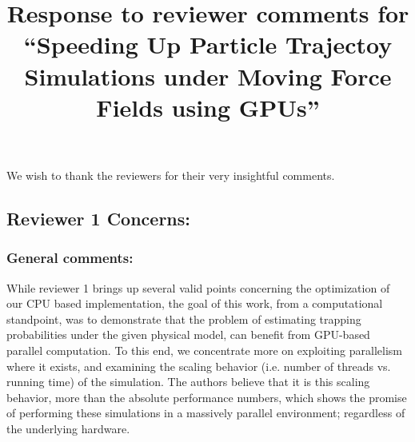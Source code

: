 \documentclass[10pt]{article}
\title{Response to reviewer comments for ``Speeding Up Particle
  Trajectoy Simulations under Moving Force Fields using GPUs''}
\begin{document}
\maketitle

\section*{}
We wish to thank the reviewers for their very insightful comments.

\subsection*{Reviewer 1 Concerns:}
\subsubsection*{General comments:}

While reviewer 1 brings up several valid points concerning the optimization of our CPU
based implementation, the goal of this work, from a computational
standpoint, was to demonstrate that the problem of estimating trapping
probabilities under the given physical model, can benefit from GPU-based parallel computation.
To this end, we concentrate more on exploiting
parallelism where it exists, and examining the scaling behavior
(i.e. number of threads vs. running time) of the simulation.  The
authors believe that it is this scaling behavior, more than the
absolute performance numbers, which shows the promise of performing
these simulations in a massively parallel environment; regardless of 
the underlying hardware.
\end{document}
